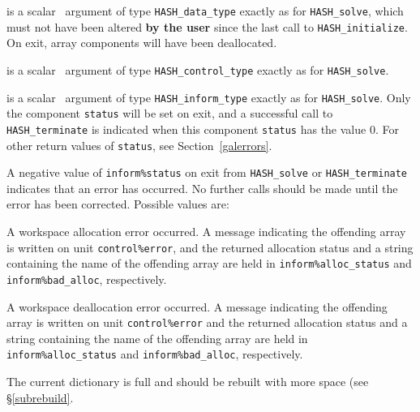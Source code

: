 \documentclass{galahad}
\newcommand{\packagename}{HASH}
\begin{document}
\vspace*{-1mm}
\begin{description}

 is a scalar \intentinout\ argument of type
{\tt \packagename\_data\_type}
exactly as for
{\tt \packagename\_solve},
which must not have been altered {\bf by the user} since the last call to
{\tt \packagename\_initialize}.
On exit, array components will have been deallocated.

 is a scalar \intentin\ argument of type
{\tt \packagename\_control\_type}
exactly as for
{\tt \packagename\_solve}.

 is a scalar \intentout\ argument of type
{\tt \packagename\_inform\_type}
exactly as for
{\tt \packagename\_solve}.
Only the component {\tt status} will be set on exit, and a
successful call to
{\tt \packagename\_terminate}
is indicated when this  component {\tt status} has the value 0.
For other return values of {\tt status}, see Section~\ref{galerrors}.

\end{description}


\galerrors
A negative value of {\tt inform\%status} on exit from
{\tt \packagename\_solve}
or
{\tt \packagename\_terminate}
indicates that an error has occurred. No further calls should be made
until the error has been corrected. Possible values are:

\begin{description}

 A workspace allocation error occurred.
A message indicating the offending
array is written on unit {\tt control\%error}, and the returned allocation
status and a string containing the name of the offending array
are held in {\tt inform\%alloc\_\-status}
and {\tt inform\%bad\_alloc}, respectively.

 A workspace deallocation error occurred.
A message indicating the offending
array is written on unit {\tt control\%error} and the returned allocation
status and a string containing the name of the offending array
are held in {\tt inform\%alloc\_\-status}
and {\tt inform\%bad\_alloc}, respectively.

 The current dictionary is full and should be rebuilt with more space
 (see \S\ref{subrebuild}.

\end{description}
\end{document}
